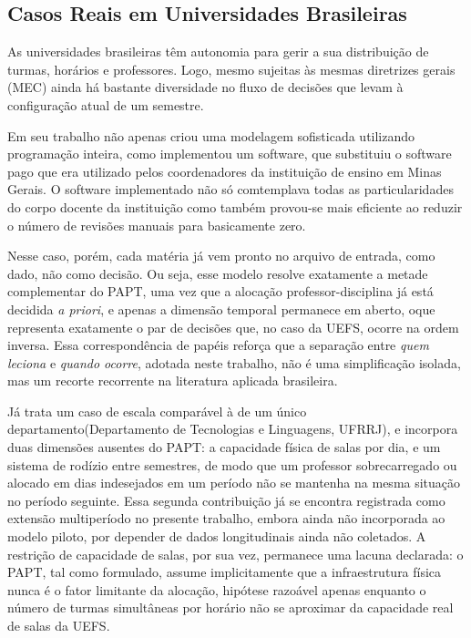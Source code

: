 \documentclass[11pt,a4paper]{article}
\begin{document}
\subsection{Casos Reais em Universidades Brasileiras}

As universidades brasileiras têm autonomia para gerir a sua distribuição de turmas, horários e professores. Logo, mesmo sujeitas às mesmas diretrizes gerais (MEC) ainda há bastante diversidade no fluxo de decisões que levam à configuração atual de um semestre.

Em seu trabalho \cite{modesto2025} não apenas criou uma modelagem sofisticada utilizando programação inteira, como implementou um software, que substituiu o software pago que era utilizado pelos coordenadores da instituição de ensino em Minas Gerais. O software implementado não só comtemplava todas as particularidades do corpo docente da instituição como também provou-se mais eficiente ao reduzir o número de revisões manuais para basicamente zero. 

Nesse caso, porém, cada matéria já vem pronto no arquivo de entrada, como dado, não como decisão. Ou seja, esse modelo resolve exatamente a metade complementar do PAPT, uma vez que a alocação professor-disciplina já está decidida \textit{a priori}, e apenas a dimensão temporal permanece em aberto, oque representa exatamente o par de decisões que, no caso da UEFS, ocorre na ordem inversa. Essa correspondência de papéis reforça que a separação entre \emph{quem leciona} e \emph{quando ocorre}, adotada neste trabalho, não é uma simplificação isolada, mas um recorte recorrente na literatura aplicada brasileira.

Já \cite{souzafilho2009} trata um caso de escala comparável à de um único departamento(Departamento de Tecnologias e Linguagens, UFRRJ), e incorpora duas dimensões ausentes do PAPT: a capacidade física de salas por dia, e um sistema de rodízio entre semestres, de modo que um professor sobrecarregado ou alocado em dias indesejados em um período
não se mantenha na mesma situação no período seguinte. Essa segunda contribuição já se encontra registrada como extensão multiperíodo no presente trabalho, embora ainda não incorporada ao modelo piloto, por depender de dados longitudinais ainda não coletados. A restrição de capacidade de salas, por sua vez, permanece uma lacuna declarada: o PAPT,
tal como formulado, assume implicitamente que a infraestrutura física nunca é o fator limitante da alocação, hipótese razoável apenas enquanto o número de turmas simultâneas por horário não se aproximar da capacidade real de salas da UEFS.
\end{document}
